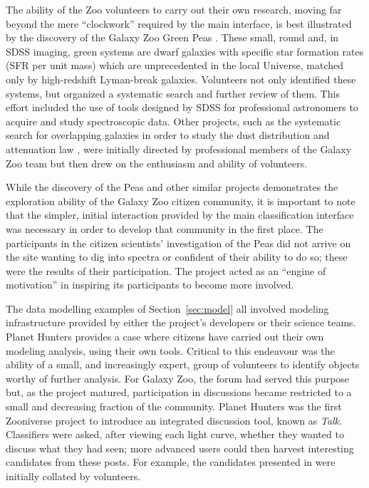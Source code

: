 \documentclass{ar2e}
\def\Sref#1{Section~\ref{#1}\xspace}
\def\CaseStudy#1{\noindent{\it\bf #1 \,\,\,\,}}
\def\Talk{{\it Talk}}
\begin{document}
The ability of the Zoo volunteers to carry out their own research, moving far
beyond the mere ``clockwork'' required by the main interface, is best
illustrated by the discovery of the Galaxy Zoo Green Peas
\citep{Cardamone++2009}. These small, round and, in SDSS imaging, green systems
are dwarf galaxies with specific star formation rates (SFR per unit mass) which
are unprecedented in the local Universe, matched only by high-redshift
Lyman-break galaxies. Volunteers not only identified these systems, but
organized a systematic search and further review of them. This effort included
the use of tools designed by SDSS for professional astronomers to acquire and
study spectroscopic data. Other projects, such as the systematic search for overlapping galaxies
\citep{Keeloverlaps} in order to study the dust distribution and attenuation law \citep{Keelatten}, were
initially directed by professional members of the Galaxy Zoo team but then drew on the 
enthusiasm and ability of volunteers. 

While the discovery of the Peas and other similar projects demonstrates the exploration ability of the
Galaxy Zoo citizen community, it is important to note that the simpler, initial
interaction provided by the main classification interface was necessary in order
to develop that community in the first place. The participants in the citizen
scientists' investigation of the Peas did not arrive on the site wanting to dig
into spectra or confident of their ability to do so; these were the results of
their participation. The project acted as an ``engine of motivation'' in
inspiring its participants to become more involved. 




\CaseStudy{Lightcurve analysis on Planet Hunters \Talk.}  

The data modelling examples of \Sref{sec:model} all involved modeling
infrastructure provided by either the project's developers or their science
teams. Planet Hunters provides a case where citizens have carried out their own
modeling analysis, using their own tools. Critical to this endeavour was the
ability of a small,  and increasingly expert, group of volunteers to identify
objects worthy of further analysis. For Galaxy Zoo, the forum had served this
purpose but, as the project matured, participation in discussions became
restricted to a small and decreasing fraction of the community. Planet Hunters
was the first Zooniverse project to introduce an integrated discussion tool,
known as \Talk. Classifiers were asked, after viewing each light curve,
whether they wanted to discuss what they had seen; more advanced users could
then harvest interesting candidates from these posts. For example, the
candidates presented in \citet{LintottPH} were initially collated by volunteers.
\end{document}
